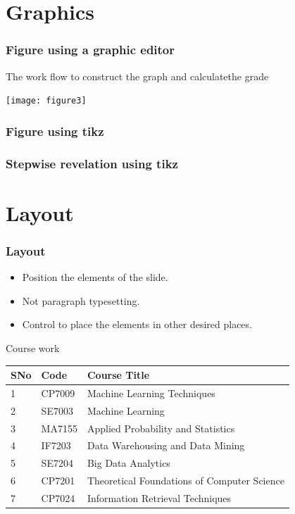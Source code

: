 \documentclass[11pt]{beamer}
\begin{document}
\section{Graphics}
\begin{frame}
  \frametitle{Figure using a graphic editor}
  The work flow to construct the graph and calculatethe grade
  \begin{center}
    \texttt{[image: figure3]}
  \end{center}
\end{frame}

\begin{frame}
  \frametitle{Figure using tikz}
  \begin{center}
    
  \end{center}
\end{frame}

\begin{frame}
  \frametitle{Stepwise revelation using tikz}
  \begin{center}
    
  \end{center}
\end{frame}

\section{Layout}

\begin{frame}
  \frametitle{Layout}
  \begin{itemize}
  \item Position the elements of the slide.
  \item Not paragraph typesetting.
  \item Control to place the elements in other desired places.
  \end{itemize}
\end{frame}

\begin{frame}{Course work}

  \begin{tabular}{lll}
    SNo & Code & Course Title\\\hline
    1 & CP7009 & Machine Learning Techniques\\
    2 & SE7003 & Machine Learning\\
    3 & MA7155 & Applied Probability and Statistics \\    
    4 & IF7203 & Data Warehousing and Data Mining \\
    5 & SE7204 & Big Data Analytics\\
    6 & CP7201 & Theoretical Foundations  of Computer Science\\
    7 & CP7024 & Information Retrieval Techniques \\
  \end{tabular} 
\end{frame}
\end{document}
